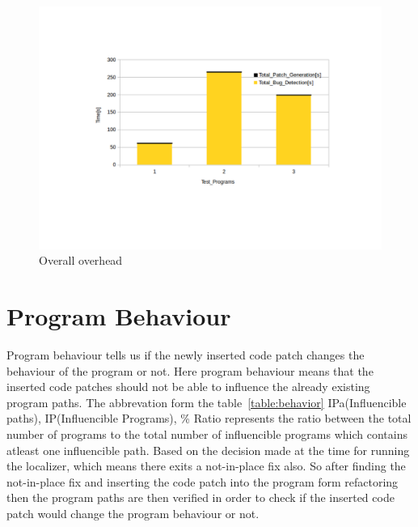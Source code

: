 \begin{figure}[!htb]
\centering
\includegraphics[trim=5.0cm 0.0cm 0.0cm 0.0cm, scale=0.75]{pdf/overall.pdf}
\vspace{-4.5cm}
\caption{Overall overhead}
\label{fig:overall}
\end{figure}
\section{Program Behaviour}
Program behaviour tells us if the newly inserted code patch changes the
behaviour of the program or not. Here program behaviour means
that the inserted code patches should not be able to influence the
already existing program paths. The abbrevation form the 
table~\ref{table:behavior}
IPa(Influencible paths), IP(Influencible Programs), \% Ratio represents
the ratio between the total number of programs to the total number of
influencible programs which contains atleast one influencible path.
Based on the decision made at the time for running the localizer,
which means there exits a not-in-place fix also. So after finding the 
not-in-place fix and inserting the code patch into the program form
refactoring then the program paths are then verified in order 
to check if the inserted code patch would change the program behaviour
or not. 


